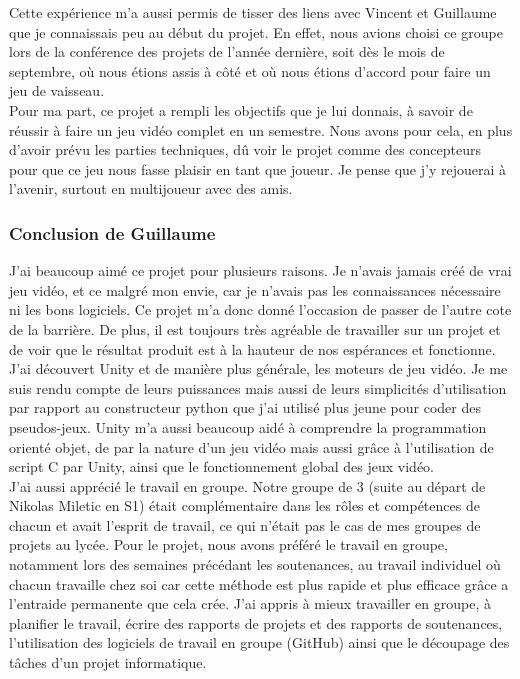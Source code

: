 \documentclass[12pt, titlepage]{article}
\begin{document}
\begin{spacing}{1.5}
Cette expérience m'a aussi permis de tisser des liens avec Vincent et Guillaume que je connaissais peu au début du projet. En effet, nous avions choisi ce groupe lors de la conférence des projets de l'année dernière, soit dès le mois de septembre, où nous étions assis à côté et où nous étions d'accord pour faire un jeu de vaisseau.\\

Pour ma part, ce projet a rempli les objectifs que je lui donnais, à savoir de réussir à faire un jeu vidéo complet en un semestre. Nous avons pour cela, en plus d'avoir prévu les parties techniques, dû voir le projet comme des concepteurs pour que ce jeu nous fasse plaisir en tant que joueur. Je pense que j'y rejouerai à l'avenir, surtout en multijoueur avec des amis.\\

\subsubsection{Conclusion de Guillaume}

J'ai beaucoup aimé ce projet pour plusieurs raisons. Je n'avais jamais créé de vrai jeu vidéo, et ce malgré mon  envie, car je n'avais pas les connaissances nécessaire ni les bons logiciels. Ce projet m'a donc donné l'occasion de passer de l'autre cote de la barrière. De plus, il est toujours très agréable de travailler sur un projet et de voir que le résultat produit est à la hauteur de nos espérances et fonctionne.\\


J'ai découvert Unity et de manière plus générale, les moteurs de jeu vidéo. Je me suis rendu compte de leurs puissances mais aussi de leurs simplicités d'utilisation par rapport au constructeur python que j'ai utilisé plus jeune pour coder des pseudos-jeux. Unity m'a aussi beaucoup aidé à comprendre la programmation orienté objet, de par la nature d'un jeu vidéo mais aussi grâce à l'utilisation de script C par Unity, ainsi que le fonctionnement global des jeux vidéo.\\

J'ai aussi apprécié le travail en groupe. Notre groupe de 3 (suite au départ de Nikolas Miletic en S1) était complémentaire dans les rôles et compétences de chacun et avait l'esprit de travail, ce qui n'était pas le cas de mes groupes de projets au lycée. Pour le projet, nous avons préféré le travail en groupe, notamment lors des semaines précédant les soutenances, au travail individuel où chacun travaille chez soi car cette méthode est plus rapide et plus efficace grâce a l'entraide permanente que cela crée. J'ai appris à mieux travailler en groupe, à planifier le travail, écrire des rapports de projets et des rapports de soutenances, l'utilisation des logiciels de travail en groupe (GitHub) ainsi que le découpage des tâches d'un projet informatique. \\


\end{spacing}
\end{document}
